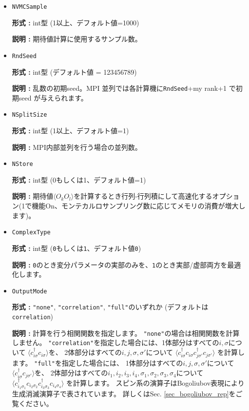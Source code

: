 \begin{itemize}
\item \verb|NVMCSample|

{\bf 形式 :} int型 (1以上、デフォルト値=1000)

{\bf 説明 :} 期待値計算に使用するサンプル数。

\item \verb|RndSeed|

{\bf 形式 :} int型 (デフォルト値 = 123456789)

{\bf 説明 :} 乱数の初期seed。MPI 並列では各計算機に\verb|RndSeed|+my rank+1 で初期seed が与えられます。

 \item \verb|NSplitSize|

{\bf 形式 :} int型 (1以上、デフォルト値=1)

{\bf 説明 :} MPI内部並列を行う場合の並列数。

\item \verb|NStore|

{\bf 形式 :} int型 (0もしくは1、デフォルト値=1)

{\bf 説明 :} 期待値$\langle O_k O_l \rangle$を計算するとき行列-行列積にして高速化するオプション(1で機能On、{モンテカルロサンプリング数に応じてメモリの消費が増大します})。
 
\item  \verb|ComplexType|
  
  {\bf 形式 :} int型 (\verb|0|もしくは\verb|1|、デフォルト値\verb|0|)

  {\bf 説明 :} \verb|0|のとき変分パラメータの実部のみを、\verb|1|のとき実部/虚部両方を最適化します。

\item \verb|OutputMode|

  {\bf 形式 :} \verb|"none"|, \verb|"correlation"|, \verb|"full"|のいずれか
  (デフォルトは\verb|correlation|)

  {\bf 説明 :} 計算を行う相関関数を指定します。
\verb|"none"|の場合は相関関数を計算しません。
\verb|"correlation"|を指定した場合には、1体部分はすべての$i, \sigma$について
$\langle c_{i \sigma}^{\dagger}c_{i \sigma} \rangle$を、
2体部分はすべての$i, j, \sigma, \sigma'$について
$\langle c_{i \sigma}^{\dagger}c_{i \sigma} c_{j \sigma'}^{\dagger}c_{j \sigma'} \rangle$
を計算します。
\verb|"full"|を指定した場合には、
1体部分はすべての$i, j, \sigma, \sigma'$について
$\langle c_{i \sigma}^{\dagger}c_{j \sigma'} \rangle$を、
2体部分はすべての$i_1, i_2, i_3, i_4, \sigma_1, \sigma_2, \sigma_3, \sigma_4$について
$\langle c_{i_1 \sigma_1}^{\dagger}c_{i_2 \sigma_2} c_{i_3 \sigma_3}^{\dagger}c_{i_4 \sigma_4} \rangle$
を計算します。
スピン系の演算子はBogoliubov表現により生成消滅演算子で表されています。
詳しくはSec. \ref{sec_bogoliubov_rep}をご覧ください。


\end{itemize}
